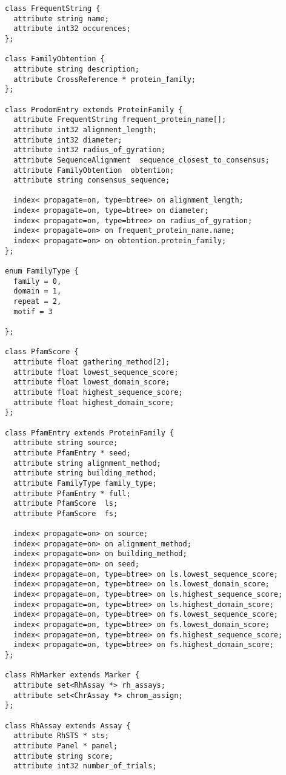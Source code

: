 \begin{verbatim}
class FrequentString {
  attribute string name;
  attribute int32 occurences;
};

class FamilyObtention {
  attribute string description;
  attribute CrossReference * protein_family;
};

class ProdomEntry extends ProteinFamily {
  attribute FrequentString frequent_protein_name[];
  attribute int32 alignment_length;
  attribute int32 diameter;
  attribute int32 radius_of_gyration;
  attribute SequenceAlignment  sequence_closest_to_consensus;
  attribute FamilyObtention  obtention;
  attribute string consensus_sequence;

  index< propagate=on, type=btree> on alignment_length;
  index< propagate=on, type=btree> on diameter;
  index< propagate=on, type=btree> on radius_of_gyration;
  index< propagate=on> on frequent_protein_name.name;
  index< propagate=on> on obtention.protein_family;
};

enum FamilyType {
  family = 0,
  domain = 1,
  repeat = 2,
  motif = 3

};

class PfamScore {
  attribute float gathering_method[2];
  attribute float lowest_sequence_score;
  attribute float lowest_domain_score;
  attribute float highest_sequence_score;
  attribute float highest_domain_score;
};

class PfamEntry extends ProteinFamily {
  attribute string source;
  attribute PfamEntry * seed;
  attribute string alignment_method;
  attribute string building_method;
  attribute FamilyType family_type;
  attribute PfamEntry * full;
  attribute PfamScore  ls;
  attribute PfamScore  fs;

  index< propagate=on> on source;
  index< propagate=on> on alignment_method;
  index< propagate=on> on building_method;
  index< propagate=on> on seed;
  index< propagate=on, type=btree> on ls.lowest_sequence_score;
  index< propagate=on, type=btree> on ls.lowest_domain_score;
  index< propagate=on, type=btree> on ls.highest_sequence_score;
  index< propagate=on, type=btree> on ls.highest_domain_score;
  index< propagate=on, type=btree> on fs.lowest_sequence_score;
  index< propagate=on, type=btree> on fs.lowest_domain_score;
  index< propagate=on, type=btree> on fs.highest_sequence_score;
  index< propagate=on, type=btree> on fs.highest_domain_score;
};

class RhMarker extends Marker {
  attribute set<RhAssay *> rh_assays;
  attribute set<ChrAssay *> chrom_assign;
};

class RhAssay extends Assay {
  attribute RhSTS * sts;
  attribute Panel * panel;
  attribute string score;
  attribute int32 number_of_trials;


\end{verbatim}
